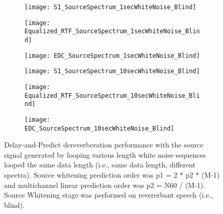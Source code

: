 \begin{figure}[H]
	\centering
	\begin{subfigure}[b]{0.3\textwidth}
		\centering
		\texttt{[image: S1\_SourceSpectrum\_1secWhiteNoise\_Blind]}
	\end{subfigure}
	\begin{subfigure}[b]{0.3\textwidth}
		\centering
		\texttt{[image: Equalized\_RTF\_SourceSpectrum\_1secWhiteNoise\_Blind]}
	\end{subfigure}
	\begin{subfigure}[b]{0.3\textwidth}
		\centering
		\texttt{[image: EDC\_SourceSpectrum\_1secWhiteNoise\_Blind]}
	\end{subfigure}
	\begin{subfigure}[b]{0.3\textwidth}
		\centering
		\texttt{[image: S1\_SourceSpectrum\_10secWhiteNoise\_Blind]}
	\end{subfigure}
	\begin{subfigure}[b]{0.3\textwidth}
		\centering
		\texttt{[image: Equalized\_RTF\_SourceSpectrum\_10secWhiteNoise\_Blind]}
	\end{subfigure}
	\begin{subfigure}[b]{0.3\textwidth}
		\centering
		\texttt{[image: EDC\_SourceSpectrum\_10secWhiteNoise\_Blind]}
	\end{subfigure}
	\caption{Delay-and-Predict dereverberation performance with the source signal generated by looping various length white noise sequences looped the same data length (i.e., same data length, different spectra). Source whitening prediction order was p1 = 2 * p2 * (M-1) and multichannel linear prediction order was p2 = N60 / (M-1). Source Whitening stage was performed on revererbant speech (i.e., blind).}
	\label{fig:params_source_spectrum_compare}
\end{figure}

